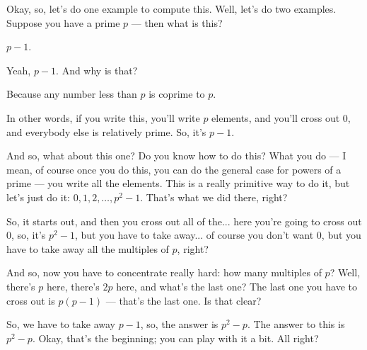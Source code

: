 \begin{speech}[00:12:03 - 00:12:15]
Okay, so, let's do one example to compute this. Well, let's do two examples. Suppose you have a prime $p$  --- then what is this?
\end{speech}

\begin{student}
$p - 1$.
\end{student}

\begin{speech}[00:12:16 - 00:12:20]
Yeah, $p - 1$. And why is that?
\end{speech}

\begin{student}
Because any number less than $p$ is coprime to $p$.
\end{student}

\begin{speech}[00:12:22 - 00:13:48]
In other words, if you write this, you'll write $p$ elements, and you'll cross out $0$, and everybody else is relatively prime. So, it's $p - 1$. 

And so, what about this one?  Do you know how to do this? What you do --- I mean, of course once you do this, you can do the general case for powers of a prime --- you write all the elements. This is a really primitive way to do it, but let's just do it: $0, 1, 2, \dots, p^2 - 1$.  That's what we did there, right?

So, it starts out, and then you cross out all of the... here you're going to cross out $0$, so, it's $p^2 - 1$, but you have to take away... of course you don't want $0$, but you have to take away all the multiples of $p$, right?

And so, now you have to concentrate really hard: how many multiples of $p$? Well, there's $p$ here, there's $2p$ here, and what's the last one? The last one you have to cross out is $p(p - 1)$ --- that's the last one.  Is that clear?

So, we have to take away $p - 1$, so, the answer is $p^2 - p$.  The answer to this is $p^2 - p$. Okay, that's the beginning; you can play with it a bit. All right?
\end{speech}

